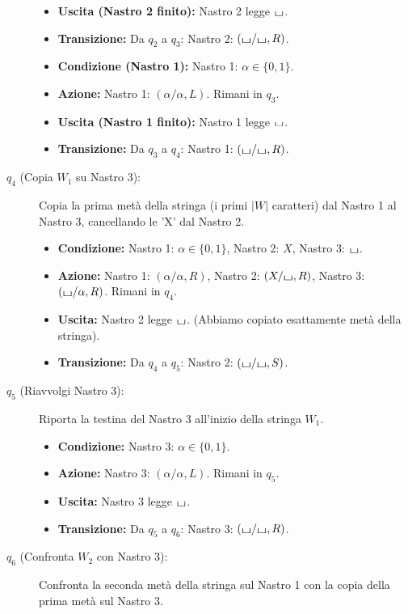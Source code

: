 \documentclass[a4paper]{article}
\theoremstyle{definition} %
\newcommand{\blankS}{\ensuremath{\raisebox{-0.15ex}{\scalebox{1.3}[0.7]{$\sqcup$}}}}
\begin{document}
\begin{description}
\begin{itemize}
        \item \textbf{Uscita (Nastro 2 finito):} Nastro 2 legge $\blankS$.
        \item \textbf{Transizione:} Da $q_2$ a $q_3$: Nastro 2: $(\blankS/\blankS, R)$.
        \item \textbf{Condizione (Nastro 1):} Nastro 1: $\alpha \in \{0,1\}$.
        \item \textbf{Azione:} Nastro 1: $(\alpha/\alpha, L)$. Rimani in $q_3$.
        \item \textbf{Uscita (Nastro 1 finito):} Nastro 1 legge $\blankS$.
        \item \textbf{Transizione:} Da $q_3$ a $q_4$: Nastro 1: $(\blankS/\blankS, R)$.
    \end{itemize}
    \item[$q_4$ (Copia $W_1$ su Nastro 3):] Copia la prima metà della stringa (i primi $|W|$ caratteri) dal Nastro 1 al Nastro 3, cancellando le 'X' dal Nastro 2.
    \begin{itemize}
        \item \textbf{Condizione:} Nastro 1: $\alpha \in \{0,1\}$, Nastro 2: $X$, Nastro 3: $\blankS$.
        \item \textbf{Azione:} Nastro 1: $(\alpha/\alpha, R)$, Nastro 2: $(X/\blankS, R)$, Nastro 3: $(\blankS/\alpha, R)$. Rimani in $q_4$.
        \item \textbf{Uscita:} Nastro 2 legge $\blankS$. (Abbiamo copiato esattamente metà della stringa).
        \item \textbf{Transizione:} Da $q_4$ a $q_5$: Nastro 2: $(\blankS/\blankS, S)$.
    \end{itemize}
    \item[$q_5$ (Riavvolgi Nastro 3):] Riporta la testina del Nastro 3 all'inizio della stringa $W_1$.
    \begin{itemize}
        \item \textbf{Condizione:} Nastro 3: $\alpha \in \{0,1\}$.
        \item \textbf{Azione:} Nastro 3: $(\alpha/\alpha, L)$. Rimani in $q_5$.
        \item \textbf{Uscita:} Nastro 3 legge $\blankS$.
        \item \textbf{Transizione:} Da $q_5$ a $q_6$: Nastro 3: $(\blankS/\blankS, R)$.
    \end{itemize}
    \item[$q_6$ (Confronta $W_2$ con Nastro 3):] Confronta la seconda metà della stringa sul Nastro 1 con la copia della prima metà sul Nastro 3.

\end{description}
\end{document}
